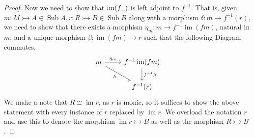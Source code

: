\documentclass{birkjour}
\theoremstyle{plain}
\theoremstyle{definition}
\newcommand{\und}[1]{\underline{\hspace{#1 cm}}}
\newcommand{\lto}{\longrightarrow}
\begin{document}
\begin{proof}
		Now we need to show that $\operatorname{im}(f\und{0.2})$ is left adjoint to $f^{-1}$. That is, given $m: M \rightarrowtail A \in \operatorname{Sub}A, r: R \rightarrowtail B \in \operatorname{Sub}B$ along with a morphism $\delta:m \lto f^{-1}(r)$, we need to show that there exists a morphism $\eta_m: m \lto f^{-1}\operatorname{im}(fm)$, natural in $m$, and a unique morphism $\beta:\operatorname{im}(fm) \lto r$ such that the following Diagram commutes.
		\begin{equation}
			\begin{tikzcd}
				m\arrow[r,"{
					\eta_{m}}"]\arrow[dr,swap,"{\delta}"] & f^{-1}\operatorname{im}(fm)\arrow[d,"{f^{-1}\beta}"]\\
				& f^{-1}(r)
			\end{tikzcd}
		\end{equation}
		We make a note that $R \cong \operatorname{im}r$, as $r$ is monic, so it suffices to show the above statement with every instance of $r$ replaced by $\operatorname{im}r$. We overload the notation $r$ and use this to denote the morphism $\operatorname{im}r \rightarrowtail B$ as well as the morphism $R \rightarrowtail B$.
		

\end{proof}
\end{document}
